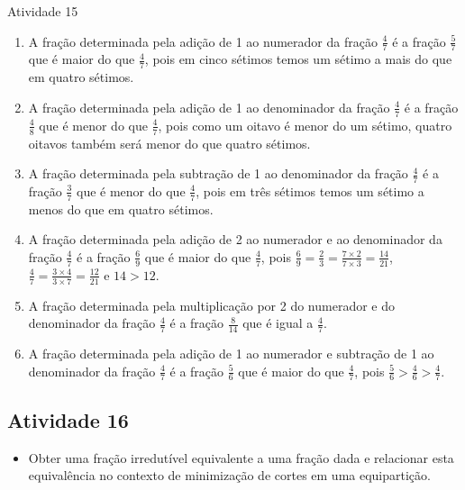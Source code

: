 \begin{multicols}{2}
\begin{resposta*}{Atividade 15}
\begin{enumerate} [\quad a)] %
    \item       A fração determinada pela adição de 1 ao numerador da fração     
  $\frac{4}{7}$       é a fração       $\frac{5}{7}$       que é maior do que    
   $\frac{4}{7}$, pois em cinco sétimos temos um sétimo a mais do que em quatro 
sétimos.
    \item       A fração determinada pela adição de 1 ao denominador da fração   
    $\frac{4}{7}$       é a fração       $\frac{4}{8}$       que é menor do que  
     $\frac{4}{7}$, pois como um oitavo é menor do um sétimo, quatro oitavos 
também será menor do que quatro sétimos.
    \item       A fração determinada pela subtração de 1 ao denominador da 
fração       $\frac{4}{7}$       é a fração       $\frac{3}{7}$       que é 
menor do que       $\frac{4}{7}$, pois em três sétimos temos um sétimo a menos 
do que em quatro sétimos.
    \item       A fração determinada pela adição de 2 ao numerador e ao 
denominador da fração       $\frac{4}{7}$       é a fração       $\frac{6}{9}$   
    que é maior do que       $\frac{4}{7}$, pois       $\frac{6}{9} = 
\frac{2}{3} = \frac{7 \times 2}{7 \times 3} = \frac{14}{21}$,       $\frac{4}{7} 
= \frac{3 \times 4}{3 \times 7} = \frac{12}{21}$       e       $14 > 12$.
    \item       A fração determinada pela multiplicação por 2 do numerador e do 
denominador da fração       $\frac{4}{7}$       é a fração       $\frac{8}{14}$  
     que é igual a       $\frac{4}{7}$.
    \item       A fração determinada pela adição de 1 ao numerador e subtração 
de 1 ao denominador da fração       $\frac{4}{7}$       é a fração       
$\frac{5}{6}$       que é maior do que       $\frac{4}{7}$, pois       
$\frac{5}{6} > \frac{4}{6} > \frac{4}{7}$.
\end{enumerate} %
  
  
\end{resposta*}



\subsection{Atividade 16}
  
\begin{itemize} %
    \item       Obter uma fração irredutível equivalente a uma fração dada e 
relacionar esta equivalência no contexto de minimização de cortes em uma 
equipartição.
\end{itemize} %
  

\end{multicols}
